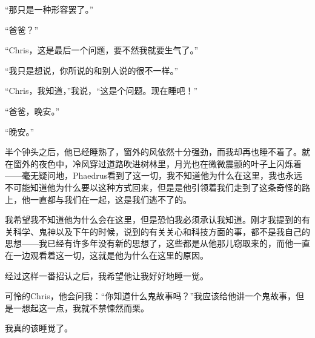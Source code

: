 \documentclass[UTF8]{article}
\begin{document}
\par “那只是一种形容罢了。”
\par “爸爸？”
\par “Chris，这是最后一个问题，要不然我就要生气了。”
\par “我只是想说，你所说的和别人说的很不一样。”
\par “Chris，我知道，”我说，“这是个问题。现在睡吧！”
\par “爸爸，晚安。”
\par “晚安。”
\par 半个钟头之后，他已经睡熟了，窗外的风依然十分强劲，而我却再也睡不着了。就在窗外的夜色中，冷风穿过道路吹进树林里，月光也在微微震颤的叶子上闪烁着——毫无疑问地，Phaedrus看到了这一切，我不知道他为什么在这里，我也永远不可能知道他为什么要以这种方式回来，但是是他引领着我们走到了这条奇怪的路上，他一直都与我们在一起，这是我们逃不了的。
\par 我希望我不知道他为什么会在这里，但是恐怕我必须承认我知道。刚才我提到的有关科学、鬼神以及下午的时候，说到的有关关心和科技方面的事，都不是我自己的思想——我已经有许多年没有新的思想了，这些都是从他那儿窃取来的，而他一直在一边观看着这一切，这就是他为什么在这里的原因。
\par 经过这样一番招认之后，我希望他让我好好地睡一觉。
\par 可怜的Chris，他会问我：“你知道什么鬼故事吗？”我应该给他讲一个鬼故事，但是一想起这一点，我就不禁悚然而栗。
\par 我真的该睡觉了。
\end{document}
